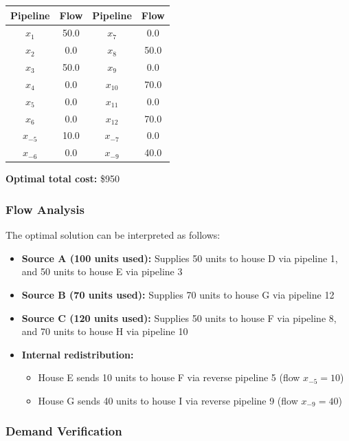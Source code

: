 \documentclass[11pt]{article}
\begin{document}
\begin{enumerate}
\begin{center}
\begin{tabular}{|c|c|c|c|}
\hline
Pipeline & Flow & Pipeline & Flow \\
\hline
$x_1$ & 50.0 & $x_7$ & 0.0 \\
$x_2$ & 0.0 & $x_8$ & 50.0 \\
$x_3$ & 50.0 & $x_9$ & 0.0 \\
$x_4$ & 0.0 & $x_{10}$ & 70.0 \\
$x_5$ & 0.0 & $x_{11}$ & 0.0 \\
$x_6$ & 0.0 & $x_{12}$ & 70.0 \\
\hline
$x_{-5}$ & 10.0 & $x_{-7}$ & 0.0 \\
$x_{-6}$ & 0.0 & $x_{-9}$ & 40.0 \\
\hline
\end{tabular}
\end{center}

\textbf{Optimal total cost:} \$950

\subsubsection*{Flow Analysis}

The optimal solution can be interpreted as follows:

\begin{itemize}
    \item \textbf{Source A (100 units used):} Supplies 50 units to house D via pipeline 1, and 50 units to house E via pipeline 3
    \item \textbf{Source B (70 units used):} Supplies 70 units to house G via pipeline 12
    \item \textbf{Source C (120 units used):} Supplies 50 units to house F via pipeline 8, and 70 units to house H via pipeline 10
    \item \textbf{Internal redistribution:} 
        \begin{itemize}
            \item House E sends 10 units to house F via reverse pipeline 5 (flow $x_{-5} = 10$)
            \item House G sends 40 units to house I via reverse pipeline 9 (flow $x_{-9} = 40$)
        \end{itemize}
\end{itemize}

\subsubsection*{Demand Verification}


\end{enumerate}
\end{document}
